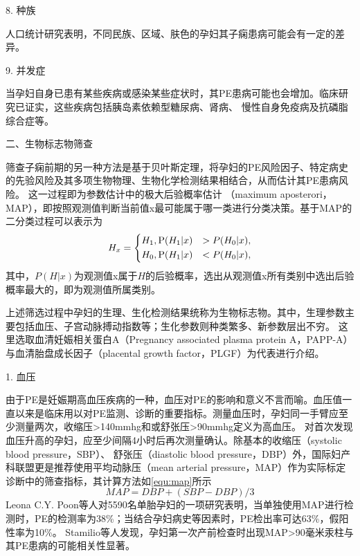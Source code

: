 8. 种族

人口统计研究表明，不同民族、区域、肤色的孕妇其子痫患病可能会有一定的差异\cite{Ghosh2014,Khalil2013}。

9. 并发症

当孕妇自身已患有某些疾病或感染某些症状时，其PE患病可能也会增加\cite{FIGO,Ray2016,OAG9}。临床研究已证实，这些疾病包括胰岛素依赖型糖尿病\cite{Lee2000,Garner1990}、肾病\cite{Martinell1990}、
慢性自身免疫病\cite{Stamilio2000}及抗磷脂综合症\cite{Dreyfus2001,Marchetti2016}等。

二、生物标志物筛查

筛查子痫前期的另一种方法是基于贝叶斯定理，将孕妇的PE风险因子、特定病史的先验风险及其多项生物物理、生物化学检测结果相结合，从而估计其PE患病风险\cite{FIGO}。
这一过程即为参数估计中的极大后验概率估计
（maximum aposterori，MAP），即按照观测值判断当前值x最可能属于哪一类进行分类决策\cite{Qiu2012}。基于MAP的二分类过程可以表示为
\begin{equation}
    \label{equ:maxap}
    H_{x}=
    \left \{
    \begin{aligned}
        &H_{1}, \text P(H_{1}|x)&>P(H_{0}|x), \\
        &H_{0}, \text P(H_{1}|x)&<P(H_{0}|x),
    \end{aligned}
    \right.  
\end{equation}
其中，$P(H|x)$为观测值x属于$H$的后验概率，选出从观测值x所有类别中选出后验概率最大的，即为观测值所属类别。

上述筛选过程中孕妇的生理、生化检测结果统称为生物标志物。其中，生理参数主要包括血压、子宫动脉搏动指数等；生化参数则种类繁多、新参数层出不穷\cite{Rene2008,Zhong2015,Zeisler2016,Rana2012}。
这里选取血清妊娠相关蛋白A（Pregnancy associated plasma protein A，PAPP-A）与血清胎盘成长因子（placental growth factor，PLGF）为代表进行介绍。

1. 血压

由于PE是妊娠期高血压疾病的一种，血压对PE的影响和意义不言而喻\cite{OAG9,HDASOM,2000s1}。血压值一直以来是临床用以对PE监测、诊断的重要指标。测量血压时，孕妇同一手臂应至少测量两次，收缩压>140mmhg和或舒张压>90mmhg定义为高血压。
对首次发现血压升高的孕妇，应至少间隔4小时后再次测量确认\cite{OAG9}。除基本的收缩压（systolic blood pressure，SBP）、
舒张压（diastolic blood pressure，DBP）外，国际妇产科联盟更是推荐使用平均动脉压（mean arterial pressure，MAP）作为实际标定诊断中的筛查指标，其计算方法如\autoref{equ:map}所示\cite{FIGO}
\begin{equation}
    \label{equ:map}
    MAP=DBP+(SBP-DBP)/3
\end{equation}
Leona C.Y. Poon等人对5590名单胎孕妇的一项研究表明，当单独使用MAP进行检测时，PE的检测率为38\%；当结合孕妇病史等因素时，PE检出率可达63\%，假阳性率为10\%\cite{Poon2008}。
Stamilio等人发现，孕妇第一次产前检查时出现MAP>90毫米汞柱与其PE患病的可能相关性显著\cite{Stamilio2000}。

